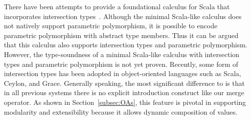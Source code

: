 There have been attempts to provide a foundational calculus
for Scala that incorporates intersection
types~\cite{amin2014foundations,amin2012dependent}.
Although the minimal Scala-like calculus does not natively support
parametric polymorphism, it is possible to encode parametric
polymorphism with abstract type members. Thus it can be argued that
this calculus also supports intersection types and parametric
polymorphism. However, the type-soundness of a minimal Scala-like
calculus with intersection types and parametric polymorphism is not
yet proven. Recently, some form of intersection
types has been adopted in object-oriented languages such as Scala,
Ceylon, and Grace. Generally speaking,
the most significant difference to \namedis is that in all previous systems
there is no explicit introduction construct like our merge operator. As shown in
Section~\ref{subsec:OAs}, this feature is pivotal in supporting modularity
and extensibility because it allows dynamic composition of values.

\begin{comment}
only allow intersections of concrete types (classes),
whereas our language allows intersections of type variables, such as
\texttt{A \& B}. Without that vehicle, we would not be able to define
the generic \texttt{merge} function (below) for all interpretations of
a given algebra, and would incur boilerplate code:

\begin{lstlisting}
let merge [A, B] (f: ExpAlg A) (g: ExpAlg B) = {
  lit (x : Int) = f.lit x ,, g.lit x,
  add (x : A & B) (y : A & B) =
    f.add x y ,, g.add x y
}
\end{lstlisting}
\end{comment}


